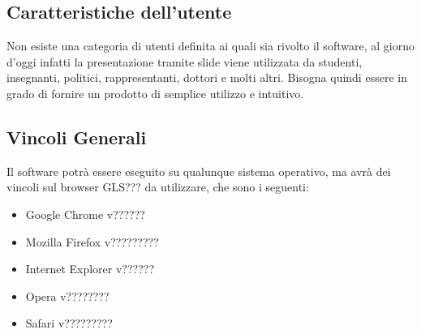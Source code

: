 \subsection{Caratteristiche dell'utente}
Non esiste una categoria di utenti definita ai quali sia rivolto il software, al giorno d'oggi infatti la presentazione tramite slide viene utilizzata da studenti, insegnanti, politici, rappresentanti, dottori e molti altri. Bisogna quindi essere in grado di fornire un prodotto di semplice utilizzo e intuitivo.

\subsection{Vincoli Generali}
Il software potrà essere eseguito su qualunque sistema operativo, ma avrà dei vincoli sul browser GLS??? da utilizzare, che sono i seguenti:
\begin{itemize}
	\item Google Chrome v??????
	\item Mozilla Firefox v?????????
	\item Internet Explorer v??????
	\item Opera v????????
	\item Safari v?????????
\end{itemize}